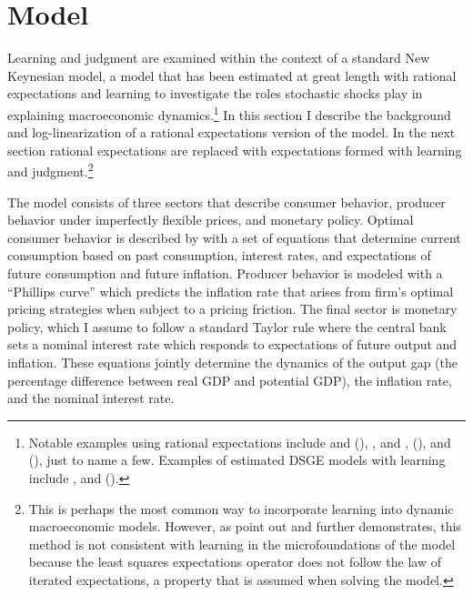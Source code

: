 \documentclass[10pt]{article}
\newcommand{\citee}[1]{\citet{#1}}
\begin{document}
\section{Model}\label{s:nk}
Learning and judgment are examined within the context of a standard New Keynesian model, a model that has been estimated at great length with rational expectations and learning to investigate the roles stochastic shocks play in explaining macroeconomic dynamics.\footnote{Notable examples using rational expectations include \citee{ireland2004} and (\citeyear{ireland_tech_2004}), \citee{nasonsmith2005}, and \citee{smetswouters2003}, (\citeyear{smetswouters2005}), and (\citeyear{smetswouters2007}), just to name a few.  Examples of estimated DSGE models with learning include \citee{milani2007}, \citee{slobodyan_wouters_2007} and (\citeyear{slobodyan_wouters_2008}).}  In this section I describe the background and log-linearization of a rational expectations version of the model.  In the next section rational expectations are replaced with expectations formed with learning and judgment.\footnote{This is perhaps the most common way to incorporate learning into dynamic macroeconomic models.  However, as \citee{marcetsargent1989} point out and \citee{preston2005} further demonstrates, this method is not consistent with learning in the microfoundations of the model because the least squares expectations operator does not follow the law of iterated expectations, a property that is assumed when solving the model.}

The model consists of three sectors that describe consumer behavior, producer behavior under imperfectly flexible prices, and monetary policy.  Optimal consumer behavior is described by with a set of equations that determine current consumption based on past consumption, interest rates, and expectations of future consumption and future inflation.  Producer behavior is modeled with a ``Phillips curve'' which predicts the inflation rate that arises from firm's optimal pricing strategies when subject to a pricing friction.  The final sector is monetary policy, which I assume to follow a standard Taylor rule where the central bank sets a nominal interest rate which responds to expectations of future output and inflation.  These equations jointly determine the dynamics of the output gap (the percentage difference between real GDP and potential GDP), the inflation rate, and the nominal interest rate.  
\end{document}

